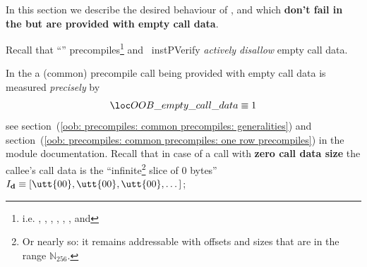 In this section we describe the desired behaviour of \instEcadd{}, \instEcmul{} and \instEcpairing{} which \textbf{don't fail in the \hubMod{} but are provided with empty call data}.

\saNote{}
Recall that ``'' precompiles\footnote{i.e.
\instPointEvaluation{},
\instBlsGOneAdd{},
\instBlsGOneMsm{},
\instBlsGTwoAdd{},
\instBlsGTwoMsm{},
\instBlsPairingCheck{},
\instBlsMapFpToGOne{} and
\instBlsMapFpTwoToGTwo{}}
and \ instPVerify{} 
\emph{actively disallow} empty call data.

\noindent In the \hubMod{} a (common) precompile call being provided with empty call data is measured \emph{precisely} by
\[
	\locOobResultEmptyCallData \equiv 1
\]
see
section~(\ref{oob: precompiles: common precompiles: generalities}) and
section~(\ref{oob: precompiles: common precompiles: one row precompiles})
in the \oobMod{} module documentation.
Recall that in case of a call with \textbf{zero call data size} the callee's call data is the
``infinite\footnote{Or nearly so: it remains addressable with offsets and sizes that are in the range $\mathbb{N}_{256}$.}
slice of $0$ bytes''
$I_\textbf{d} \equiv [\utt{00}, \utt{00}, \utt{00}, \dots]$;

